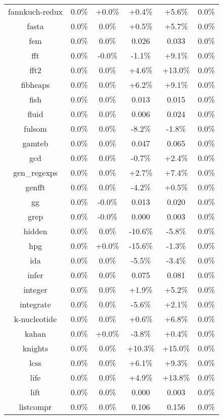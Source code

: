 \begin{tabular}{ c c c c c c }
fannkuch-redux &  0.0\% & +0.0\% & +0.4\% & +5.6\% &  0.0\%\\
fasta &  0.0\% &  0.0\% & +0.5\% & +5.7\% &  0.0\%\\
fem &  0.0\% &  0.0\% & 0.026 & 0.033 &  0.0\%\\
fft &  0.0\% & -0.0\% & -1.1\% & +9.1\% &  0.0\%\\
fft2 &  0.0\% &  0.0\% & +4.6\% & +13.0\% &  0.0\%\\
fibheaps &  0.0\% &  0.0\% & +6.2\% & +9.1\% &  0.0\%\\
fish &  0.0\% &  0.0\% & 0.013 & 0.015 &  0.0\%\\
fluid &  0.0\% &  0.0\% & 0.006 & 0.024 &  0.0\%\\
fulsom &  0.0\% &  0.0\% & -8.2\% & -1.8\% &  0.0\%\\
gamteb &  0.0\% &  0.0\% & 0.047 & 0.065 &  0.0\%\\
gcd &  0.0\% &  0.0\% & -0.7\% & +2.4\% &  0.0\%\\
gen\_regexps &  0.0\% &  0.0\% & +2.7\% & +7.4\% &  0.0\%\\
genfft &  0.0\% &  0.0\% & -4.2\% & +0.5\% &  0.0\%\\
gg &  0.0\% & -0.0\% & 0.013 & 0.020 &  0.0\%\\
grep &  0.0\% & -0.0\% & 0.000 & 0.003 &  0.0\%\\
hidden &  0.0\% &  0.0\% & -10.6\% & -5.8\% &  0.0\%\\
hpg &  0.0\% & +0.0\% & -15.6\% & -1.3\% &  0.0\%\\
ida &  0.0\% &  0.0\% & -5.5\% & -3.4\% &  0.0\%\\
infer &  0.0\% &  0.0\% & 0.075 & 0.081 &  0.0\%\\
integer &  0.0\% &  0.0\% & +1.9\% & +5.2\% &  0.0\%\\
integrate &  0.0\% &  0.0\% & -5.6\% & +2.1\% &  0.0\%\\
k-nucleotide &  0.0\% &  0.0\% & +0.6\% & +6.8\% &  0.0\%\\
kahan &  0.0\% & +0.0\% & -3.8\% & +0.4\% &  0.0\%\\
knights &  0.0\% &  0.0\% & +10.3\% & +15.0\% &  0.0\%\\
lcss &  0.0\% &  0.0\% & +6.1\% & +9.3\% &  0.0\%\\
life &  0.0\% &  0.0\% & +4.9\% & +13.8\% &  0.0\%\\
lift &  0.0\% &  0.0\% & 0.000 & 0.003 &  0.0\%\\
listcompr &  0.0\% &  0.0\% & 0.106 & 0.156 &  0.0\%\\

\end{tabular}
